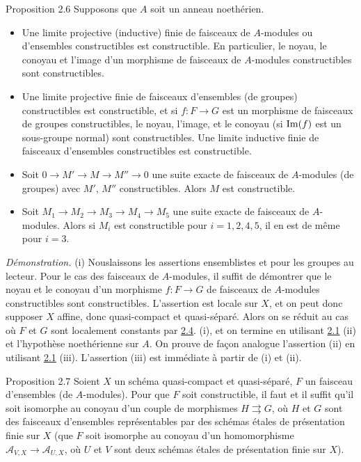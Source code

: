 \documentclass[10pt]{../fichiers-configuration-latex/smfart}
\begin{document}
\begin{enonce*}{Proposition 2.6}
Supposons que $A$ soit un anneau noethérien.
\begin{itemize}
\item[(i)] Une limite projective (\resp inductive) finie de faisceaux de
  $A$-modules ou d'ensembles constructibles est constructible. En
  particulier, le noyau, le conoyau et l'image d'un morphisme de
  faisceaux de $A$-modules constructibles sont constructibles.

\item[(i bis)] Une limite projective finie de faisceaux d'ensembles
  (\resp de groupes) constructibles est constructible, et si
  $f:F\rightarrow G$ est un morphisme de faisceaux de groupes
  constructibles, le noyau, l'image, et le conoyau (si $\operatorname{Im}(f)$ est un
  sous-groupe normal) sont constructibles. Une limite inductive finie
  de faisceaux d'ensembles constructibles est constructible.

\item[(ii)] Soit $0\rightarrow M'\rightarrow M\rightarrow M''\rightarrow 0$
  une suite exacte de faisceaux de $A$-modules (\resp de groupes) avec
  $M'$, $M''$ constructibles. Alors $M$ est constructible.

\item[(iii)] Soit $M_1\rightarrow M_2\rightarrow M_3\rightarrow
  M_4\rightarrow M_5$ une suite exacte de faisceaux de
  $A$-modules. Alors si $M_i$ est constructible pour $i=1,2,4,5$, il
  en est de même pour $i=3$.
\end{itemize}
\end{enonce*}

\emph{Démonstration.} (i) Nous\pageoriginale laissons les assertions
ensemblistes et pour les groupes au lecteur. Pour le cas des faisceaux
de $A$-modules, il suffit de démontrer que le noyau et le conoyau d'un
morphisme $f:F\rightarrow G$ de faisceaux de $A$-modules
constructibles sont constructibles. L'assertion est locale sur $X$, et
on peut donc supposer $X$ affine, donc quasi-compact et
quasi-séparé. Alors on se réduit au cas où $F$ et $G$ sont localement
constants par \hyperref[IX.prop2.4]{2.4}. (i), et on termine en utilisant \hyperref[IX.lem2.1]{2.1} (ii) et
l'hypothèse noethérienne sur $A$. On prouve de façon analogue
l'assertion (ii) en utilisant \hyperref[IX.lem2.1]{2.1} (iii). L'assertion (iii) est
immédiate à partir de (i) et (ii).

\begin{enonce*}{Proposition 2.7}
Soient $X$ un schéma quasi-compact et quasi-séparé, $F$ un faisceau
d'ensembles (\resp de $A$-modules). Pour que $F$ soit constructible,
il faut et il suffit qu'il soit isomorphe au conoyau d'un couple de
morphismes $H\rightrightarrows G$, où $H$ et $G$ sont des faisceaux
d'ensembles représentables par des schémas étales de présentation
finie sur $X$ (\resp que $F$ soit isomorphe au conoyau d'un
homomorphisme $𝒜_{V,X}\rightarrow 𝒜_{U,X}$, où $U$ et $V$ sont
deux schémas étales de présentation finie sur $X$).
\end{enonce*}
\end{document}
